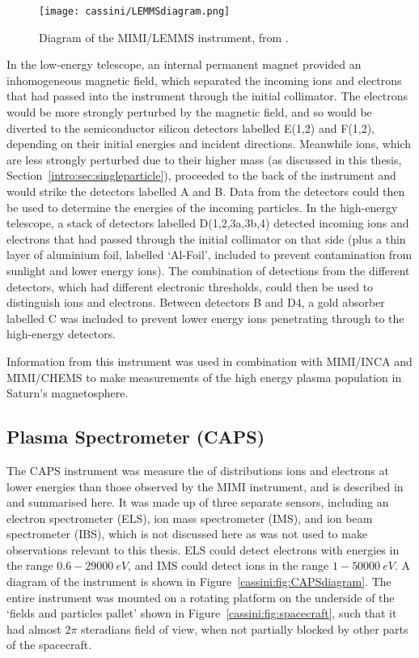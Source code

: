 \begin{figure}
\centering
\noindent\texttt{[image: cassini/LEMMSdiagram.png]}
\caption[Diagram of the MIMI/LEMMS instrument.]{Diagram of the MIMI/LEMMS instrument, from \citet{krimigis2004}.}
\label{cassini:fig:LEMMSdiagram}
\end{figure}

In the low-energy telescope, an internal permanent magnet provided an inhomogeneous magnetic field, which separated the incoming ions and electrons that had passed into the instrument through the initial collimator. The electrons would be more strongly perturbed by the magnetic field, and so would be diverted to  the  semiconductor silicon detectors labelled E(1,2) and F(1,2), depending on their initial energies and incident directions. Meanwhile ions, which are  less strongly perturbed due to their higher mass  (as discussed in this thesis, Section~\ref{intro:sec:singleparticle}), proceeded to the back of the instrument and would strike the detectors labelled A and B. Data from the  detectors could then be used to determine the energies of the  incoming  particles. In the high-energy telescope, a stack of detectors labelled D(1,2,3a,3b,4) detected incoming ions and electrons that had passed through the initial collimator on that side (plus a thin layer of aluminium foil, labelled `Al-Foil', included to prevent contamination from sunlight and lower energy ions). The combination of detections from the different detectors, which had different electronic thresholds, could then be used to distinguish ions and electrons.  Between detectors B and D4,  a gold absorber labelled C was included to prevent lower energy ions penetrating through to the high-energy detectors.

Information from this instrument  was used in combination with MIMI/INCA and MIMI/CHEMS to make measurements of the high energy plasma population in Saturn's magnetosphere.

\subsection{Plasma Spectrometer (CAPS)}
The CAPS instrument was measure the of distributions ions and electrons at lower energies than those observed by the MIMI instrument, and is described in \citet{young2004} and summarised here.  It was made up of three separate sensors, including an electron spectrometer (ELS), ion mass spectrometer (IMS), and ion beam spectrometer  (IBS), which is  not discussed here as was not used to make observations relevant to this thesis. ELS could detect electrons with energies in the range ${0.6}{-}\SI{29000}{eV}$,  and IMS could detect ions in the range ${1}{-}\SI{50000}{eV}$. A diagram of the instrument is shown in Figure~\ref{cassini:fig:CAPSdiagram}. The entire instrument was mounted on a  rotating  platform on the underside of the `fields and particles pallet'  shown in Figure~\ref{cassini:fig:spacecraft}, such that it had almost $2\pi$ steradians field of view, when not partially blocked by  other parts of the spacecraft.

